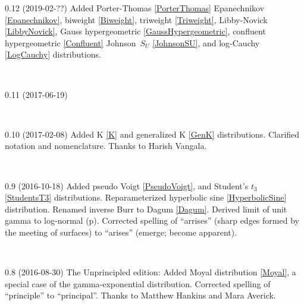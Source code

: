 {
\small \tightstretch




0.12 (2019-02-??) 
Added
Porter-Thomas \eqref{PorterThomas}
Epanechnikov \eqref{Epanechnikov},
biweight \eqref{Biweight},
triweight \eqref{Triweight},
Libby-Novick \eqref{LibbyNovick},
Gauss hypergeometric \eqref{GaussHypergeometric},
confluent hypergeometric \eqref{Confluent}
Johnson~$S_U$ \eqref{JohnsonSU},
and
log-Cauchy \eqref{LogCauchy}
distributions. 

~

0.11 (2017-06-19)

~

0.10 (2017-02-08)
Added K \eqref{K}  and generalized K  \eqref{GenK} distributions.
Clarified notation and nomenclature.
Thanks to Harish Vangala.

~

0.9 (2016-10-18)
Added 
	pseudo Voigt \eqref{PseudoVoigt}, 
and
	Student's $t_3$ \eqref{StudentsT3}
distributions.
Reparameterized hyperbolic sine \eqref{HyperbolicSine} distribution.
Renamed inverse Burr to Dagum \eqref{Dagum}. %
Derived limit of unit gamma to log-normal (p\pageref{UnitGammaToLogNormal}). 
Corrected spelling of  ``arrises'' (sharp edges formed by the meeting of surfaces) to ``arises'' (emerge; become apparent). 

~

0.8 (2016-08-30)
The Unprincipled edition:
Added Moyal distribution \eqref{Moyal}, a special case of the gamma-exponential distribution.
Corrected spelling of ``principle'' to ``principal''. Thanks to Matthew Hankins and Mara Averick.

}
